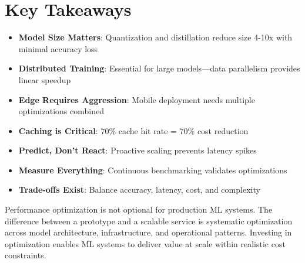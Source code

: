 \section{Key Takeaways}

\begin{itemize}
    \item \textbf{Model Size Matters}: Quantization and distillation reduce size 4-10x with minimal accuracy loss
    \item \textbf{Distributed Training}: Essential for large models---data parallelism provides linear speedup
    \item \textbf{Edge Requires Aggression}: Mobile deployment needs multiple optimizations combined
    \item \textbf{Caching is Critical}: 70\% cache hit rate = 70\% cost reduction
    \item \textbf{Predict, Don't React}: Proactive scaling prevents latency spikes
    \item \textbf{Measure Everything}: Continuous benchmarking validates optimizations
    \item \textbf{Trade-offs Exist}: Balance accuracy, latency, cost, and complexity
\end{itemize}

Performance optimization is not optional for production ML systems. The difference between a prototype and a scalable service is systematic optimization across model architecture, infrastructure, and operational patterns. Investing in optimization enables ML systems to deliver value at scale within realistic cost constraints.
